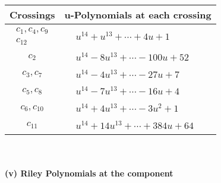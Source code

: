 \documentclass[1p]{elsarticle_modified}
\theoremstyle{definition}
\begin{document}
\begin{tabular}{m{50pt}|m{274pt}}
Crossings & \hspace{64pt}u-Polynomials at each crossing \\
\hline $$\begin{aligned}c_{1},c_{4},c_{9}\\c_{12}\end{aligned}$$&$\begin{aligned}
&u^{14}+u^{13}+\cdots+4 u+1
\end{aligned}$\\
\hline $$\begin{aligned}c_{2}\end{aligned}$$&$\begin{aligned}
&u^{14}-8 u^{13}+\cdots-100 u+52
\end{aligned}$\\
\hline $$\begin{aligned}c_{3},c_{7}\end{aligned}$$&$\begin{aligned}
&u^{14}-4 u^{13}+\cdots-27 u+7
\end{aligned}$\\
\hline $$\begin{aligned}c_{5},c_{8}\end{aligned}$$&$\begin{aligned}
&u^{14}-7 u^{13}+\cdots-16 u+4
\end{aligned}$\\
\hline $$\begin{aligned}c_{6},c_{10}\end{aligned}$$&$\begin{aligned}
&u^{14}+4 u^{13}+\cdots-3 u^2+1
\end{aligned}$\\
\hline $$\begin{aligned}c_{11}\end{aligned}$$&$\begin{aligned}
&u^{14}+14 u^{13}+\cdots+384 u+64
\end{aligned}$\\
\hline
\end{tabular}\\~\\
\newpage\renewcommand{\arraystretch}{1}
\flushleft \textbf{(v) Riley Polynomials at the component}\newline \\
\end{document}
